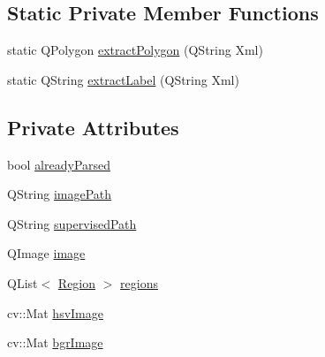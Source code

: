 \subsection*{Static Private Member Functions}
\begin{DoxyCompactItemize}
\item 
static Q\+Polygon \hyperlink{class_supervised_image_aaeaaf36c52ed6317d547461d39a57b4e}{extract\+Polygon} (Q\+String Xml)
\item 
static Q\+String \hyperlink{class_supervised_image_af603900bba42552e5d8395a5a265907a}{extract\+Label} (Q\+String Xml)
\end{DoxyCompactItemize}
\subsection*{Private Attributes}
\begin{DoxyCompactItemize}
\item 
bool \hyperlink{class_supervised_image_a9a749e02a7d0f6ba28725465e5f7a29f}{already\+Parsed}
\item 
Q\+String \hyperlink{class_supervised_image_a39f8b0212d2dae489d7b060b0d8dd1b9}{image\+Path}
\item 
Q\+String \hyperlink{class_supervised_image_aeeb634f3804dffba600e6aea71fc353e}{supervised\+Path}
\item 
Q\+Image \hyperlink{class_supervised_image_a0641d3087990ef954a6d5e88e927bbc5}{image}
\item 
Q\+List$<$ \hyperlink{class_region}{Region} $>$ \hyperlink{class_supervised_image_a2113ab863b2253b37dab1d7b575e8b10}{regions}
\item 
cv\+::\+Mat \hyperlink{class_supervised_image_a757a552539e544c09eea62df46e91e09}{hsv\+Image}
\item 
cv\+::\+Mat \hyperlink{class_supervised_image_a40aec823ee64d4bce926e39381f48e28}{bgr\+Image}
\end{DoxyCompactItemize}


